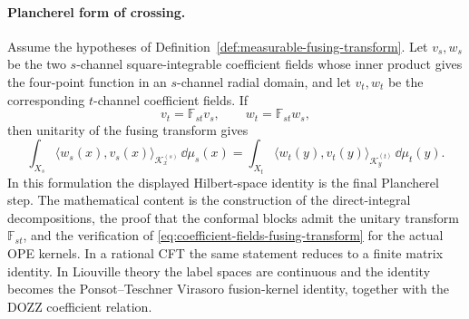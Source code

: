 \paragraph{Plancherel form of crossing.}
Assume the hypotheses of Definition~\ref{def:measurable-fusing-transform}.
Let \(v_s,w_s\) be the two \(s\)-channel square-integrable coefficient fields
whose inner product gives the four-point function in an \(s\)-channel radial
domain, and let \(v_t,w_t\) be the corresponding \(t\)-channel coefficient
fields.  If
\begin{equation}
  v_t=\mathbb F_{st}v_s,\qquad w_t=\mathbb F_{st}w_s,
  \label{eq:coefficient-fields-fusing-transform}
\end{equation}
then unitarity of the fusing transform gives
\begin{equation}
  \int_{X_s}
    \langle w_s(x),v_s(x)\rangle_{\mathcal K_x^{(s)}}\,\dd\mu_s(x)
  =
  \int_{X_t}
    \langle w_t(y),v_t(y)\rangle_{\mathcal K_y^{(t)}}\,\dd\mu_t(y).
  \label{eq:direct-integral-crossing}
\end{equation}
In this formulation the displayed Hilbert-space identity is the final
Plancherel step.  The mathematical content is the construction of the
direct-integral decompositions, the proof that the conformal blocks admit the
unitary transform \(\mathbb F_{st}\), and the verification of
\eqref{eq:coefficient-fields-fusing-transform} for the actual OPE kernels.
In a rational CFT the same statement reduces to a finite matrix identity.  In
Liouville theory the label spaces are continuous and the identity becomes the
Ponsot--Teschner Virasoro fusion-kernel identity, together with the DOZZ
coefficient relation.


